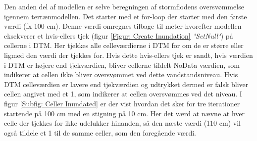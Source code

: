 Den anden del af modellen er selve beregningen af stormflodens oversvømmelse igennem terrænmodellen. Det starter med et for-loop der starter med den første værdi (fx 100 cm). Denne værdi omregnes tilbage til meter hvorefter modellen eksekverer et hvis-ellers tjek (figur \ref{Figur: Create Inundation} \textit{"SetNull"}) på cellerne i DTM. Her tjekkes alle celleværdierne i DTM for om de er større eller ligmed den værdi der tjekkes for. Hvis dette hvis-ellers tjek er sandt, hvis værdien i DTM er højere end tjekværdien, bliver cellerne tildelt NoData værdien, som indikerer at cellen ikke bliver oversvømmet ved dette vandstandsniveau. Hvis DTM celleværdien er lavere end tjekværdien og udtrykket dermed er falsk bliver cellen angivet med et 1, som indikerer at cellen oversvømmes ved det niveau. I figur \ref{Subfig: Celler Inundated} er der vist hvordan det sker for tre iterationer startende på 100 cm med en stigning på 10 cm. Her det værd at nævne at hver celle der tjekkes for ikke udelukker hinanden, så den næste værdi (110 cm) vil også tildele et 1 til de samme celler, som den foregående værdi. 
